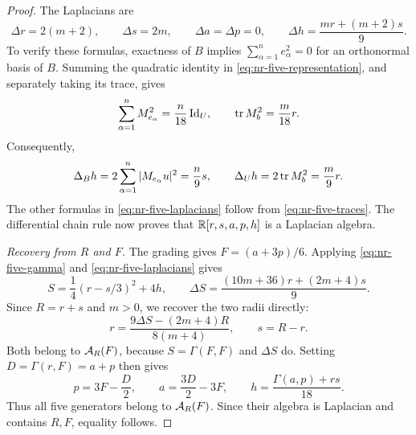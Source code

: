 \begin{proof}
The Laplacians are
\begin{equation}\label{eq:nr-five-laplacians}
 \Delta r=2(m+2),\qquad \Delta s=2m,\qquad
 \Delta a=\Delta p=0,\qquad
 \Delta h=\frac{mr+(m+2)s}{9}.
\end{equation}
To verify these formulas, exactness of $B$ implies
$\sum_{\alpha=1}^n e_\alpha^2=0$ for an orthonormal basis of $B$.
Summing the quadratic identity in \eqref{eq:nr-five-representation},
and separately taking its trace, gives
\[
 \sum_{\alpha=1}^n M_{e_\alpha}^2=\frac n{18}\operatorname{Id}_U,
 \qquad \operatorname{tr} M_b^2=\frac m{18}r.
\]
Consequently,
\[
 \Delta_Bh=2\sum_{\alpha=1}^n|M_{e_\alpha}u|^2=\frac n9s,
 \qquad \Delta_Uh=2\operatorname{tr} M_b^2=\frac m9r.
\]
The other formulas in \eqref{eq:nr-five-laplacians} follow from
\eqref{eq:nr-five-traces}. The differential chain rule now proves
that $\mathbb R[r,s,a,p,h]$ is a Laplacian algebra.

\emph{Recovery from $R$ and $F$.}
The grading gives $F=(a+3p)/6$. Applying
\eqref{eq:nr-five-gamma} and \eqref{eq:nr-five-laplacians} gives
\begin{equation}\label{eq:nr-five-gradient-square}
 S=\frac14(r-s/3)^2+4h,\qquad
 \Delta S=\frac{(10m+36)r+(2m+4)s}{9}.
\end{equation}
Since $R=r+s$ and $m>0$, we recover the two radii directly:
\begin{equation}\label{eq:nr-five-radius-recovery}
 r=\frac{9\Delta S-(2m+4)R}{8(m+4)},\qquad s=R-r.
\end{equation}
Both belong to $\mathcal A_R(F)$, because $S=\Gamma(F,F)$ and
$\Delta S$ do. Setting $D=\Gamma(r,F)=a+p$ then gives
\[
 p=3F-\frac D2,\qquad
 a=\frac{3D}{2}-3F,\qquad
 h=\frac{\Gamma(a,p)+rs}{18}.
\]
Thus all five generators belong to $\mathcal A_R(F)$. Since their algebra
is Laplacian and contains $R,F$, equality follows.


\end{proof}
